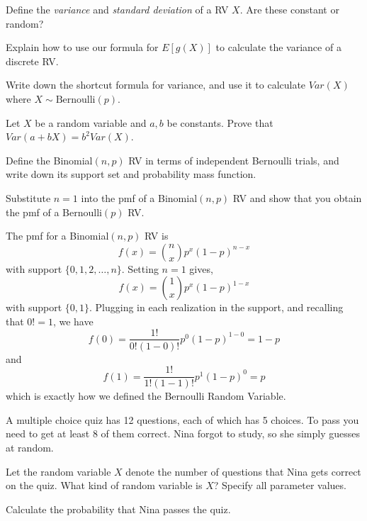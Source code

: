 \documentclass[addpoints,12pt]{exam}
\begin{document}
\begin{questions}



\question Define the \emph{variance} and \emph{standard deviation} of a RV $X$. Are these constant or random?

\question Explain how to use our formula for $E[g(X)]$ to calculate the variance of a discrete RV. 

\question Write down the shortcut formula for variance, and use it to calculate $Var(X)$ where $X\sim\mbox{Bernoulli}(p)$. 

\question Let $X$ be a random variable and $a,b$ be constants. 
Prove that $Var(a + bX) = b^2 Var(X)$.

\question Define the Binomial$(n,p)$ RV in terms of independent Bernoulli trials, and write down its support set and probability mass function.

\question Substitute $n=1$ into the pmf of a Binomial$(n,p)$ RV and show that you obtain the pmf of a Bernoulli$(p)$ RV.
	\begin{solution}
		The pmf for a Binomial$(n,p)$ RV is
		$$f(x) = {n \choose x} p^x (1-p)^{n-x}$$
		with support $\{0, 1, 2, \dots, n\}$. Setting $n=1$ gives,
		$$f(x) = {1 \choose x} p^x (1-p)^{1-x}$$
		with support $\{0,1\}$. Plugging in each realization in the support, and recalling that $0! = 1$, we have
			$$f(0) = \frac{1!}{0!(1-0)!} p^0 (1-p)^{1-0} = 1 - p$$
		and
		$$f(1) = \frac{1!}{1!(1-1)!} p^1 (1-p)^0 = p$$
		which is exactly how we defined the Bernoulli Random Variable.
	\end{solution}

\question A multiple choice quiz has 12 questions, each of which has 5 choices. To pass you need to get at least 8 of them correct. Nina forgot to study, so she simply guesses at random.
\begin{parts}
  \item Let the random variable $X$ denote the number of questions that Nina gets correct on the quiz. What kind of random variable is $X$? Specify all parameter values.
  \item Calculate the probability that Nina passes the quiz.
\end{parts}


\end{questions}
\end{document}

